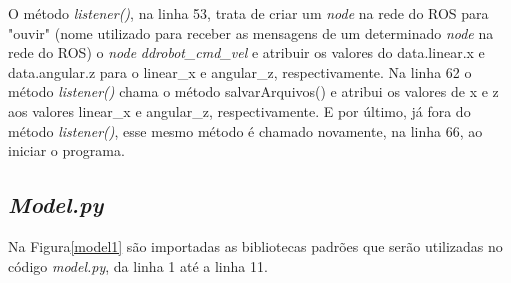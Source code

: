 O método \textit{listener()}, na linha 53, trata de criar um \textit{node} na rede do ROS para "ouvir" (nome utilizado para receber as mensagens de um determinado \textit{node} na rede do ROS) o \textit{node} \textit{ddrobot\_cmd\_vel} e atribuir os valores do data.linear.x e data.angular.z para o linear\_x e angular\_z, respectivamente.
Na linha 62 o método \textit{listener()} chama o método salvarArquivos() e atribui os valores de x e z aos valores linear\_x e angular\_z, respectivamente. E por último, já fora do método \textit{listener()}, esse mesmo método é chamado novamente, na linha 66, ao iniciar o programa.

\subsection{\textit{Model.py}}
\label{codigo_model}

	\begin{figure}[H]
		\centering
\end{figure}

Na Figura\ref{model1} são importadas as bibliotecas padrões que serão utilizadas no código \textit{model.py}, da linha 1 até a linha 11.

	\begin{figure}[H]
		\centering
\end{figure}

